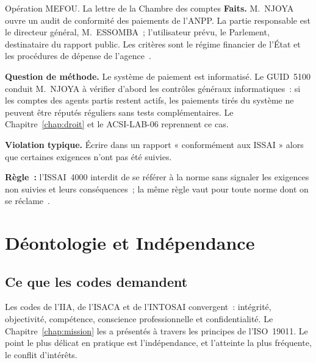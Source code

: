 \begin{boxscenario}{Opération MEFOU. La lettre de la Chambre des comptes}
\textbf{Faits.} M.~NJOYA ouvre un audit de conformité des paiements de
l'ANPP. La partie responsable est le directeur général, M.~ESSOMBA~;
l'utilisateur prévu, le Parlement, destinataire du rapport public. Les
critères sont le régime financier de l'État et les procédures de dépense
de l'agence~\cite{minfi2023regimefinancier}.

\medskip
\textbf{Question de méthode.} Le système de paiement est informatisé. Le
GUID~5100 conduit M.~NJOYA à vérifier d'abord les contrôles généraux
informatiques~: si les comptes des agents partis restent actifs, les
paiements tirés du système ne peuvent être réputés réguliers sans tests
complémentaires. Le Chapitre~\ref{chap:droit} et le ACSI-LAB-06 reprennent ce
cas.
\end{boxscenario}

\begin{boxalert}
\textbf{Violation typique.} Écrire dans un rapport « conformément aux
ISSAI » alors que certaines exigences n'ont pas été suivies.

\smallskip
\textbf{Règle~:} l'ISSAI~4000 interdit de se référer à la norme sans
signaler les exigences non suivies et leurs conséquences~; la même règle
vaut pour toute norme dont on se réclame~\cite{idi2021conformite}.
\end{boxalert}

\section{Déontologie et Indépendance}
\label{sec:c13-deontologie}

\subsection{Ce que les codes demandent}

Les codes de l'IIA, de l'ISACA et de l'INTOSAI convergent~: intégrité,
objectivité, compétence, conscience professionnelle et confidentialité.
Le Chapitre~\ref{chap:mission} les a présentés à travers les principes de
l'ISO~19011. Le point le plus délicat en pratique est l'indépendance, et
l'atteinte la plus fréquente, le conflit d'intérêts.

